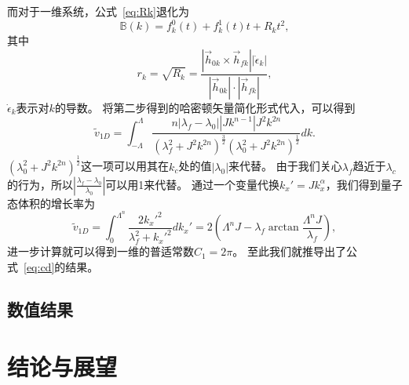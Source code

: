 			而对于一维系统，公式~\eqref{eq:Rk}退化为
			\begin{equation}
				\mathbb{B}(k) = f_k^0(t)+f_k^1(t) t+R_k t^2,
			\end{equation}
			其中
			\begin{equation} \label{Eq:rk_1D}
				r_k = \sqrt{R_k} = \frac{|{\vec{h}}_{0k}\times \vec{h}_{fk}||\dot{\epsilon}_k|}{|{\vec{h}}_{0k}|\cdot|\vec{h}_{fk}|},
			\end{equation}
			$\dot{\epsilon}_k$表示对$k$的导数。
			将第二步得到的哈密顿矢量简化形式代入，可以得到
			\begin{equation}
				\tilde{v}_{1D} = \int_{-\Lambda}^{\Lambda}{\frac{n |\lambda_f-\lambda_0||J k^{n-1}|J^2 k^{2n}}{(\lambda_f^2+J^2 k^{2n})^{\frac32}(\lambda_0^2+J^2 k^{2n})^{\frac12}} dk}.
			\end{equation}
			$(\lambda_0^2+J^2 k^{2n})^{\frac12}$这一项可以用其在$k_c$处的值$|\lambda_0|$来代替。
			由于我们关心$\lambda_f$趋近于$\lambda_c$的行为，所以$|\frac{\lambda_f-\lambda_0}{\lambda_0}|$可以用1来代替。
			通过一个变量代换$k_x'=J k_x^\alpha$，我们得到量子态体积的增长率为
			\begin{equation}
				\tilde{v}_{1D} = \int_{0}^{\Lambda^n}{\frac{2k_x'^2}{\lambda_f^2+k_x'^2}}dk_x'
				= 2\left(\Lambda^nJ-\lambda_f\arctan{\frac{\Lambda^nJ}{\lambda_f}}\right),
			\end{equation}
			进一步计算就可以得到一维的普适常数$C_1=2\pi$。
			至此我们就推导出了公式~\eqref{eq:cd}的结果。
			
		\subsection{数值结果}
		
				

	\section{结论与展望}